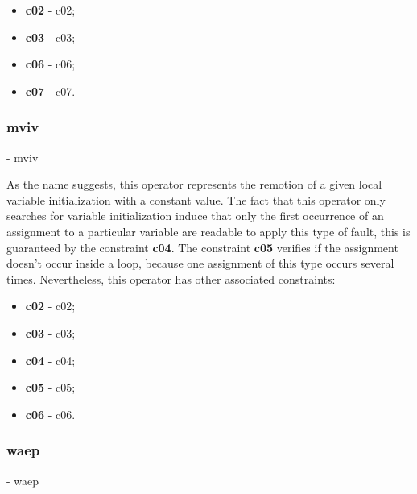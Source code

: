 	\begin{itemize}
		\item \textbf{\acs{c02}} - \Acl{c02};
		\item \textbf{\acs{c03}} - \Acl{c03};
		\item \textbf{\acs{c06}} - \Acl{c06};
		\item \textbf{\acs{c07}} - \Acl{c07}.
	\end{itemize}

	\subsubsection{\textbf{\acs{mviv}}} - \Acl{mviv}

	As the name suggests, this operator represents the remotion of a given local variable initialization with a constant value. The fact that this operator only searches for variable initialization induce that only the first occurrence of an assignment to a particular variable are readable to apply this type of fault, this is guaranteed by the constraint \textbf{\acs{c04}}. The constraint \textbf{\acs{c05}} verifies if the assignment doesn't occur inside a loop, because one assignment of this type occurs several times. Nevertheless, this operator has other associated constraints:

	\begin{itemize}
		\item \textbf{\acs{c02}} - \Acl{c02};
		\item \textbf{\acs{c03}} - \Acl{c03};
		\item \textbf{\acs{c04}} - \Acl{c04};
		\item \textbf{\acs{c05}} - \Acl{c05};
		\item \textbf{\acs{c06}} - \Acl{c06}.
	\end{itemize}




	\subsubsection{\textbf{\acs{waep}}} - \Acl{waep}

